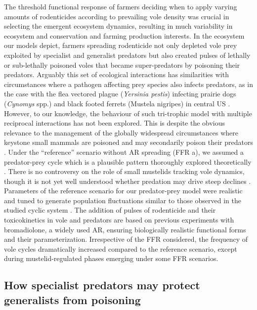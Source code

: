 \documentclass[11pt]{article}
\begin{document}
The threshold functional response of farmers deciding when to apply varying amounts of rodenticides according to prevailing vole density was crucial in selecting the emergent ecosystem dynamics, resulting in much variability in ecosystem and conservation and farming production interests. In the ecosystem our models depict, farmers spreading rodenticide not only depleted vole prey exploited by specialist and generalist predators but also created pulses of lethally or sub-lethally poisoned voles that became super-predators by poisoning their predators.  Arguably this set of ecological interactions has similarities with circumstances where a pathogen affecting prey species also infects predators, as in the case with the flea vectored plague (\textit{Yersinia pestis}) infecting prairie dogs (\textit{Cynomys} spp.) and black footed ferrets (Mustela nigripes) in central US \citep{Matchett2010}. However, to our knowledge, the behaviour of such tri-trophic model with multiple reciprocal interactions has not been explored. This is despite the obvious relevance to the management of the globally widespread circumstances where keystone small mammals are poisoned and may secondarily poison their predators \citep{Delibes-Mateos2011}.  
Under the “reference” scenario without AR spreading (FFR a), we assumed a predator-prey cycle which is a plausible pattern thoroughly explored theoretically \citep{Hanski2001}. There is no controversy on the role of small mustelids tracking vole dynamics, though it is not yet well understood whether predation may drive steep declines \citep{King2006}. Parameters of the reference scenario for our predator-prey model were realistic and tuned to generate population fluctuations similar to those observed in the studied cyclic system \citep{Delattre2009}.  The addition of pulses of rodenticide and their toxicokinetics in vole and predators are based on previous experiments with bromadiolone, a widely used AR, ensuring biologically realistic functional forms and their parameterization. Irrespective of the FFR considered, the frequency of vole cycles dramatically increased compared to the reference scenario, except during mustelid-regulated phases emerging under some FFR scenarios.

\subsection{How specialist predators may protect generalists from poisoning}
\end{document}
